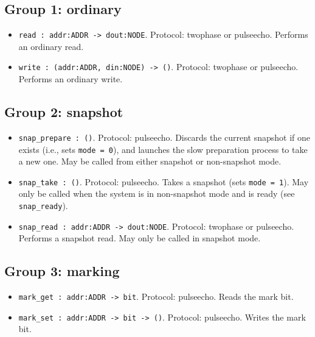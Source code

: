 \documentclass[a4paper]{article}
\newcommand{\code}[1]{\texttt{#1}}
\begin{document}

\subsection*{Group 1: ordinary}
\begin{itemize}
\item \code{read : addr:ADDR -> dout:NODE}. Protocol: twophase or pulseecho. Performs an ordinary read.
\item \code{write : (addr:ADDR, din:NODE) -> ()}. Protocol: twophase or pulseecho. Performs an ordinary write.
\end{itemize}

\subsection*{Group 2: snapshot}
\begin{itemize}
\item \code{snap\_prepare : ()}. Protocol: pulseecho. Discards the current snapshot if one exists (i.e., sets \code{mode = 0}), and launches the slow preparation process to take a new one. May be called from either snapshot or non-snapshot mode.
\item \code{snap\_take : ()}. Protocol: pulseecho. Takes a snapshot (sets \code{mode = 1}). May only be called when the system is in non-snapshot mode and is ready (see \code{snap\_ready}).
\item \code{snap\_read : addr:ADDR -> dout:NODE}. Protocol: twophase or pulseecho. Performs a snapshot read. May only be called in snapshot mode.
\end{itemize}

\subsection*{Group 3: marking}
\begin{itemize}
\item \code{mark\_get : addr:ADDR -> bit}. Protocol: pulseecho. Reads the mark bit.
\item \code{mark\_set : addr:ADDR -> bit -> ()}. Protocol: pulseecho. Writes the mark bit.
\end{itemize}
\end{document}
